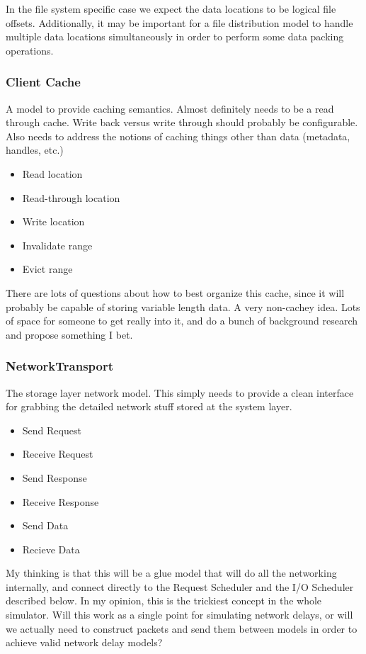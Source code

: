 \documentclass[11pt]{article}
\begin{document}
In the file system specific case we expect the data locations to be logical 
file offsets.  Additionally, it may be important for a file distribution
model to handle multiple data locations simultaneously in order to perform
some data packing operations.

\subsubsection{Client Cache}
A model to provide caching semantics.  Almost definitely needs to be a read
through cache.  Write back versus write through should probably be
configurable.  Also needs to address the notions of caching things other than
data (metadata, handles, etc.)

\begin{itemize}
\item Read location
\item Read-through location
\item Write location
\item Invalidate range
\item Evict range
\end{itemize}

There are lots of questions about how to best organize this cache, since it
will probably be capable of storing variable length data.  A very non-cachey
idea.  Lots of space for someone to get really into it, and do a bunch of
background research and propose something I bet.

\subsubsection{NetworkTransport}
The storage layer network model.  This simply needs to provide a clean
interface for grabbing the detailed network stuff stored at the system layer.

\begin{itemize}
\item Send Request
\item Receive Request
\item Send Response
\item Receive Response
\item Send Data
\item Recieve Data
\end{itemize}

My thinking is that this will be a glue model that will do all the networking
internally, and connect directly to the Request Scheduler and the I/O
Scheduler described below.  In my opinion, this is the trickiest concept in
the whole simulator.  Will this work as a single point for simulating network
delays, or will we actually need to construct packets and send them between
models in order to achieve valid network delay models?
\end{document}
